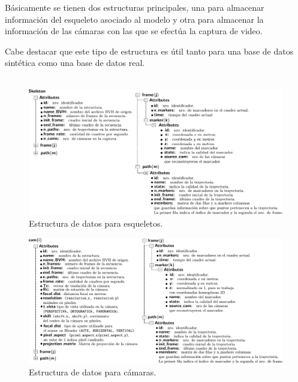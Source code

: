 Básicamente se tienen dos estructuras principales, una para almacenar información del esqueleto asociado al modelo y otra para almacenar la información de las cámaras con las que se efectúa la captura de video.

Cabe destacar que este tipo de estructura es útil tanto para una base de datos sintética como una base de datos real. \\
\\

\begin{figure}[H]
   \hspace{-1.2cm}
   \includegraphics[scale=0.6]{img/Base_Datos/Estructura_datos_skeleton.pdf}
   \caption{Estructura de datos para esqueletos.}  
   \label{img_estructura_skeleton} 
 \end{figure} 

\begin{figure}[H]
   \hspace{-1.2cm}
   \includegraphics[scale=0.6]{img/Base_Datos/Estructura_datos_cam.pdf}
   \caption{Estructura de datos para cámaras.}
   \label{img_estructura_cam}    
 \end{figure} 


